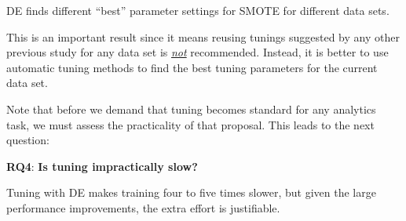\documentclass[sigconf,review, anonymous]{acmart}
\theoremstyle{break}
\theoremstyle{break}
\begin{document}
 \begin{lesson}DE finds different ``best'' parameter settings for SMOTE for different data sets.
 \end{lesson}
  This is an important result
  since it means
  reusing tunings  suggested  by  any other  previous study  for any data set is \underline{{\em not}} recommended. Instead,  it is better to
      use automatic tuning  methods  to find the best tuning parameters for the 
      current data set.
      
       Note that
 before we demand that tuning becomes
 standard for any analytics task,
 we must assess the practicality of that
 proposal. This leads to the next question:
 
   \textbf{RQ4}: \textbf{Is tuning 
   impractically
   slow?} 
 
 \begin{lesson}Tuning with DE makes training four to five times slower, but given
 the large performance improvements,
 the extra effort is justifiable. \end{lesson}
 
 
 
\end{document}
